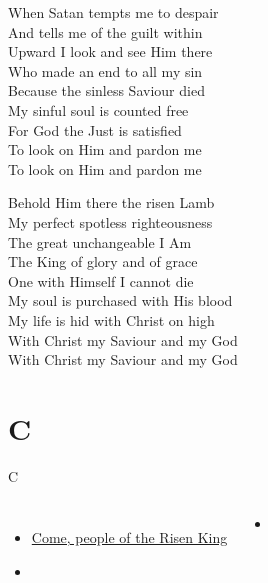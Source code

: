 \documentclass[aspectratio=169]{beamer}
\begin{document}
{\begin{frame}{}
When Satan tempts me to despair\\ 
And tells me of the guilt within\\ 
Upward I look and see Him there\\ 
Who made an end to all my sin\\ 
Because the sinless Saviour died\\ 
My sinful soul is counted free\\ 
For God the Just is satisfied\\ 
To look on Him and pardon me\\ 
To look on Him and pardon me

\end{frame}
\hypertarget{Before the throne of God above[]3}{}
\begin{frame}{}
\fontsize{16.666666666666668}{20.0}\selectfont

Behold Him there the risen Lamb\\ 
My perfect spotless righteousness\\ 
The great unchangeable I Am\\ 
The King of glory and of grace\\ 
One with Himself I cannot die\\ 
My soul is purchased with His blood\\ 
My life is hid with Christ on high\\ 
With Christ my Saviour and my God\\ 
With Christ my Saviour and my God

\end{frame}
}

\section{ C }

\begin{frame}[t]{C}
\begin{columns}[t]
\begin{itemize}
    \item \hyperlink{Come, people of the Risen King[]}{Come, people of the Risen King}
    \item[] \phantom{1}
\end{itemize}
\begin{itemize}
    \item[] \phantom{1}
\end{itemize}
\end{columns}
\end{frame}
\end{document}
